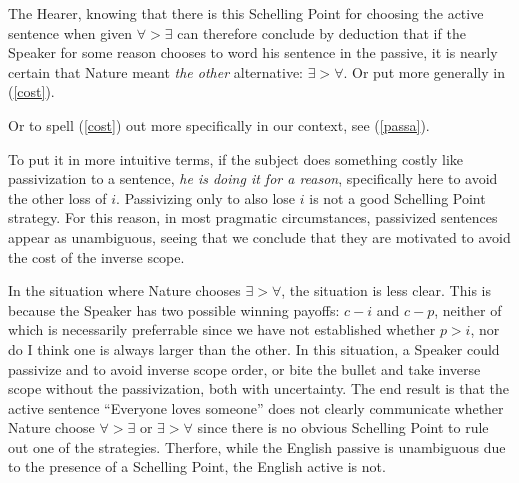 \documentclass{article}
\begin{document}
The Hearer, knowing that there is this Schelling Point for choosing the active sentence when given ${\forall}>{\exists}$ can therefore conclude by deduction that if the Speaker for some reason chooses to word his sentence in the passive, it is nearly certain that Nature meant \emph{the other} alternative: ${\exists}>{\forall}$.
Or put more generally in (\ref{cost}).

\begin{exe}
\end{exe}



Or to spell (\ref{cost}) out more specifically in our context, see (\ref{passa}).


\begin{exe}
\end{exe}

To put it in more intuitive terms, if the subject does something costly like passivization to a sentence, \emph{he is doing it for a reason}, specifically here to avoid the other loss of $i$.
Passivizing only to also lose $i$ is not a good Schelling Point strategy.
For this reason, in most pragmatic circumstances, passivized sentences appear as unambiguous, seeing that we conclude that they are motivated to avoid the cost of the inverse scope.

In the situation where Nature chooses ${\exists}>{\forall}$, the situation is less clear.
This is because the Speaker has two possible winning payoffs: $c-i$ and $c-p$, neither of which is necessarily preferrable since we have not established whether $p>i$, nor do I think one is always larger than the other.
In this situation, a Speaker could passivize and to avoid inverse scope order, or bite the bullet and take inverse scope without the passivization, both with uncertainty.
The end result is that the active sentence ``Everyone loves someone'' does not clearly communicate whether Nature choose ${\forall}>{\exists}$ or ${\exists}>{\forall}$ since there is no obvious Schelling Point to rule out one of the strategies. Therfore, while the English passive is unambiguous due to the presence of a Schelling Point, the English active is not.
\end{document}
